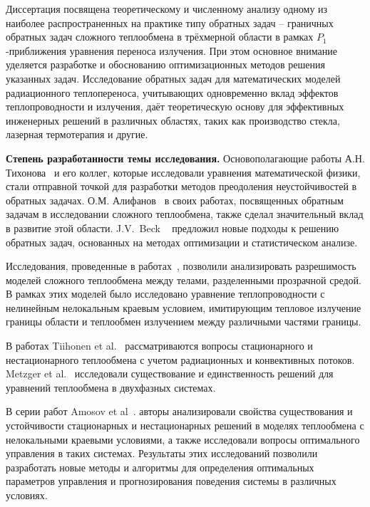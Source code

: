     Диссертация посвящена теоретическому и численному анализу одному из
    наиболее распространенных на практике типу обратных задач – граничных
    обратных задач сложного теплообмена в трёхмерной области в рамках
    $P_1$-приближения уравнения переноса излучения.
    При этом основное внимание уделяется разработке
    и обоснованию оптимизационных методов решения указанных задач.
    Исследование обратных задач для математических моделей
    радиационного теплопереноса, учитывающих одновременно вклад эффектов
    теплопроводности и излучения, даёт теоретическую основу для эффективных
    инженерных решений в различных областях, таких как производство стекла,
    лазерная термотерапия и другие.


    \textbf{Степень разработанности темы исследования.}
    Основополагающие работы А.Н. Тихонова~\cite{TikhonovSamarskii1972} и его коллег,
    которые исследовали уравнения математической физики, стали отправной точкой для
    разработки методов преодоления неустойчивостей в обратных задачах.
    О.М. Алифанов~\cite{Aliphanov2009} в своих работах, посвященных обратным задачам
    в исследовании сложного теплообмена, также сделал значительный вклад в развитие этой области.
    J.V.\ Beck ~\cite[]{Beck1985-fg} предложил новые подходы к решению обратных задач,
    основанных на методах оптимизации и статистическом анализе.


    Исследования, проведенные в работах~\cite{
        Tiihonen1997a, Tiihonen1997b, metzger1999existence, Amosov2005,
        Amosov2009, Philip2010, Amosov2016, Amosov2017,
        amosov2010stationary, druet2009weak, druet2010weak, laitinen2001conductive},
    позволили анализировать разрешимость моделей сложного теплообмена между телами,
    разделенными прозрачной средой.
    В рамках этих моделей было исследовано уравнение теплопроводности
    с нелинейным нелокальным краевым условием, имитирующим тепловое излучение
    границы области и теплообмен излучением между различными частями границы.

    В работах Tiihonen et al.~\cite{Tiihonen1997a, Tiihonen1997b} рассматриваются вопросы
    стационарного и нестационарного теплообмена с учетом радиационных и конвективных потоков.
    Metzger et al.~\cite{metzger1999existence} исследовали существование и единственность
    решений для уравнений теплообмена в двухфазных системах.


    В серии работ Amosov et
    al~\cite{Amosov2005, Amosov2009, Amosov2016, Amosov2017, amosov2010stationary}.
    авторы анализировали свойства существования и устойчивости стационарных
    и нестационарных решений в моделях теплообмена с нелокальными краевыми условиями,
    а также исследовали вопросы оптимального управления в таких системах.
    Результаты этих исследований позволили разработать новые методы и алгоритмы для определения
    оптимальных параметров управления и прогнозирования поведения системы в различных условиях.

